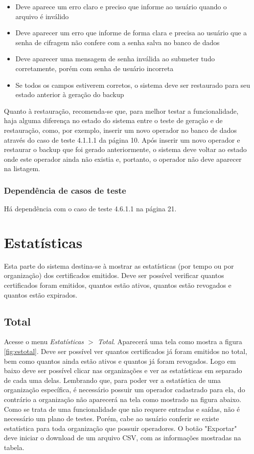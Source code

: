 \begin{itemize}

	\item Deve aparece um erro claro e preciso que informe ao usuário quando o arquivo é inválido
	\item Deve aparecer um erro que informe de forma clara e precisa ao usuário que a senha de cifragem não confere com a senha salva no banco de dados
	\item Deve aparecer uma mensagem de senha inválida ao submeter tudo corretamente, porém com senha de usuário incorreta
	\item Se todos os campos estiverem corretos, o sistema deve ser restaurado para seu estado anterior à geração do backup
	
\end{itemize}

Quanto à restauração, recomenda-se que, para melhor testar a funcionalidade, haja alguma diferença no estado do sistema entre o teste de geração e de restauração, como, por exemplo, inserir um novo operador no banco de dados através do caso de teste 4.1.1.1 da página 10. Após inserir um novo operador e restaurar o backup que foi gerado anteriormente, o sistema deve voltar ao estado onde este operador ainda não existia e, portanto, o operador não deve aparecer na listagem.

\subsubsection{Dependência de casos de teste}
Há dependência com o caso de teste 4.6.1.1 na página 21.

\section{Estatísticas}

Esta parte do sistema destina-se à mostrar as estatísticas (por tempo ou por organização) dos certificados emitidos. Deve ser possível verificar quantos certificados foram emitidos, quantos estão ativos, quantos estão revogados e quantos estão expirados.

\subsection{Total}

Acesse o menu \textit{Estatísticas $>$ Total}. Aparecerá uma tela como mostra a figura \ref{fig:estotal}. Deve ser possível ver quantos certificados já foram emitidos no total, bem como quantos ainda estão ativos e quantos já foram revogados. Logo em baixo deve ser possível clicar nas organizações e ver as estatísticas em separado de cada uma delas. Lembrando que, para poder ver a estatística de uma organização específica, é necessário possuir um operador cadastrado para ela, do contrário a organização não aparecerá na tela como mostrado na figura abaixo. Como se trata de uma funcionalidade que não requere entradas e saídas, não é necessário um plano de testes. Porém, cabe ao usuário conferir se existe estatística para toda organização que possuir operadores. O botão "Exportar" deve iniciar o download de um arquivo CSV, com as informações mostradas na tabela.

